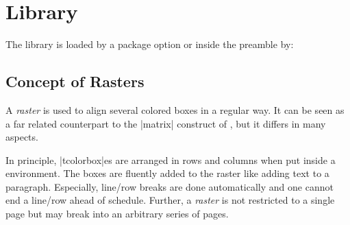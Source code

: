 \clearpage
\section{Library }\label{sec:raster}%
%
The library is loaded by a package option or inside the preamble by:
\begin{dispListing}
\end{dispListing}


\subsection{Concept of Rasters}\label{subsec:raster_overview}

A \emph{raster} is used to align several colored boxes in a regular way.
It can be seen as a far related counterpart to the |matrix| construct
of \tikzname, but it differs in many aspects.

In principle, |tcolorbox|es are arranged in rows and columns when put
inside a  environment. The boxes are fluently added to the
raster like adding text to a paragraph.
Especially, line/row breaks are done
automatically and one cannot end a line/row ahead of schedule.
Further, a \emph{raster} is not restricted to a single page but may
break into an arbitrary series of pages.

